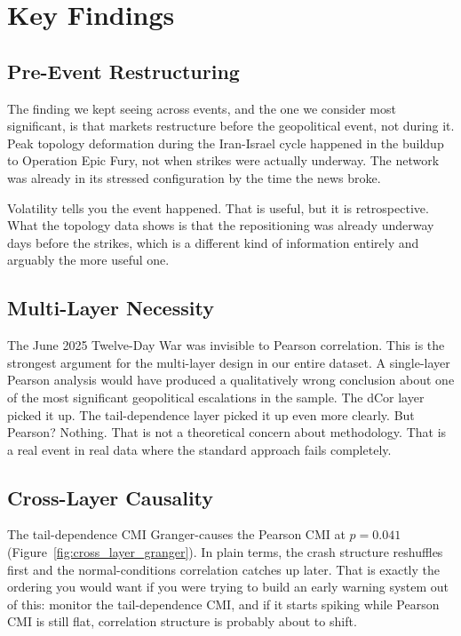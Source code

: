 \documentclass[12pt, letterpaper]{article}
\begin{document}
\section{Key Findings}

\subsection{Pre-Event Restructuring}

The finding we kept seeing across events, and the one we consider most significant, is that markets restructure before the geopolitical event, not during it. Peak topology deformation during the Iran-Israel cycle happened in the buildup to Operation Epic Fury, not when strikes were actually underway. The network was already in its stressed configuration by the time the news broke.

Volatility tells you the event happened. That is useful, but it is retrospective. What the topology data shows is that the repositioning was already underway days before the strikes, which is a different kind of information entirely and arguably the more useful one.

\subsection{Multi-Layer Necessity}

The June 2025 Twelve-Day War was invisible to Pearson correlation. This is the strongest argument for the multi-layer design in our entire dataset. A single-layer Pearson analysis would have produced a qualitatively wrong conclusion about one of the most significant geopolitical escalations in the sample. The dCor layer picked it up. The tail-dependence layer picked it up even more clearly. But Pearson? Nothing. That is not a theoretical concern about methodology. That is a real event in real data where the standard approach fails completely.

\subsection{Cross-Layer Causality}

The tail-dependence CMI Granger-causes the Pearson CMI at $p = 0.041$ (Figure~\ref{fig:cross_layer_granger}). In plain terms, the crash structure reshuffles first and the normal-conditions correlation catches up later. That is exactly the ordering you would want if you were trying to build an early warning system out of this: monitor the tail-dependence CMI, and if it starts spiking while Pearson CMI is still flat, correlation structure is probably about to shift.
\end{document}
